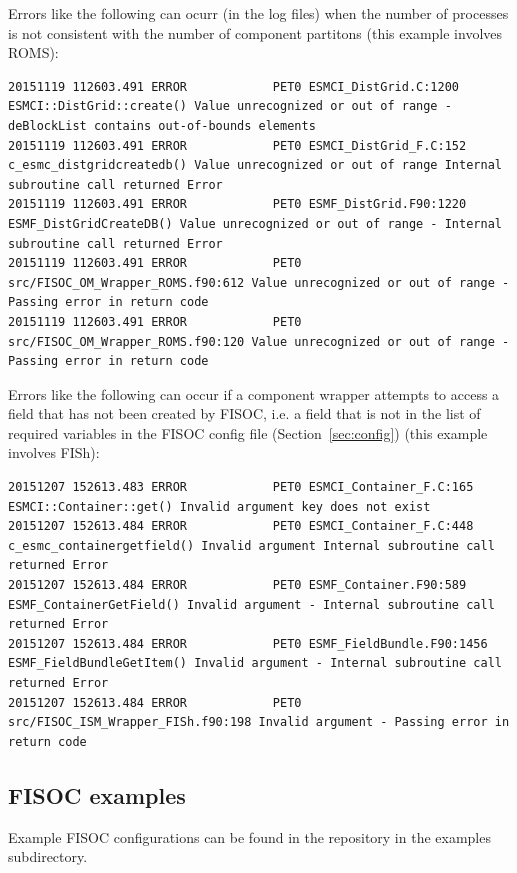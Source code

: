 \documentclass[11pt]{article}
\begin{document}
Errors like the following can ocurr (in the log files) when the number of processes is 
not consistent with the number of component partitons (this example involves ROMS):
\begin{lstlisting}
20151119 112603.491 ERROR            PET0 ESMCI_DistGrid.C:1200 ESMCI::DistGrid::create() Value unrecognized or out of range - deBlockList contains out-of-bounds elements
20151119 112603.491 ERROR            PET0 ESMCI_DistGrid_F.C:152 c_esmc_distgridcreatedb() Value unrecognized or out of range Internal subroutine call returned Error
20151119 112603.491 ERROR            PET0 ESMF_DistGrid.F90:1220 ESMF_DistGridCreateDB() Value unrecognized or out of range - Internal subroutine call returned Error
20151119 112603.491 ERROR            PET0 src/FISOC_OM_Wrapper_ROMS.f90:612 Value unrecognized or out of range - Passing error in return code
20151119 112603.491 ERROR            PET0 src/FISOC_OM_Wrapper_ROMS.f90:120 Value unrecognized or out of range - Passing error in return code
\end{lstlisting}

Errors like the following can occur if a component wrapper attempts to access a field 
that has not been created by FISOC, i.e. a field that is not in the list of
required variables in the FISOC config file (Section~\ref{sec:config}) 
(this example involves FISh):
\begin{lstlisting}
20151207 152613.483 ERROR            PET0 ESMCI_Container_F.C:165 ESMCI::Container::get() Invalid argument key does not exist
20151207 152613.484 ERROR            PET0 ESMCI_Container_F.C:448 c_esmc_containergetfield() Invalid argument Internal subroutine call returned Error
20151207 152613.484 ERROR            PET0 ESMF_Container.F90:589 ESMF_ContainerGetField() Invalid argument - Internal subroutine call returned Error
20151207 152613.484 ERROR            PET0 ESMF_FieldBundle.F90:1456 ESMF_FieldBundleGetItem() Invalid argument - Internal subroutine call returned Error
20151207 152613.484 ERROR            PET0 src/FISOC_ISM_Wrapper_FISh.f90:198 Invalid argument - Passing error in return code
\end{lstlisting}





\subsection{FISOC examples}

Example FISOC configurations can be found in the repository in the 
examples subdirectory. 
\end{document}
